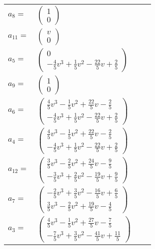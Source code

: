 \documentclass[1p]{elsarticle_modified}
\theoremstyle{definition}
\begin{document}
\begin{tabular}{m{7pt} m{180pt} m{7pt} m{180pt} }
\flushright $a_{8}=$&$\begin{pmatrix}1\\0\end{pmatrix}$ \\
\flushright $a_{11}=$&$\begin{pmatrix}v\\0\end{pmatrix}$ \\
\flushright $a_{5}=$&$\begin{pmatrix}0\\-\frac{4}{5} v^3+\frac{1}{5} v^2-\frac{22}{5} v+\frac{2}{5}\end{pmatrix}$ \\
\flushright $a_{9}=$&$\begin{pmatrix}1\\0\end{pmatrix}$ \\
\flushright $a_{6}=$&$\begin{pmatrix}\frac{4}{5} v^3-\frac{1}{5} v^2+\frac{22}{5} v-\frac{2}{5}\\-\frac{4}{5} v^3+\frac{1}{5} v^2-\frac{22}{5} v+\frac{2}{5}\end{pmatrix}$ \\
\flushright $a_{4}=$&$\begin{pmatrix}\frac{4}{5} v^3-\frac{1}{5} v^2+\frac{22}{5} v-\frac{2}{5}\\-\frac{4}{5} v^3+\frac{1}{5} v^2-\frac{22}{5} v+\frac{2}{5}\end{pmatrix}$ \\
\flushright $a_{12}=$&$\begin{pmatrix}\frac{3}{5} v^3-\frac{2}{5} v^2+\frac{24}{5} v-\frac{9}{5}\\-\frac{3}{5} v^3+\frac{2}{5} v^2-\frac{19}{5} v+\frac{9}{5}\end{pmatrix}$ \\
\flushright $a_{7}=$&$\begin{pmatrix}-\frac{2}{5} v^3+\frac{3}{5} v^2-\frac{16}{5} v+\frac{6}{5}\\\frac{3}{5} v^3-\frac{2}{5} v^2+\frac{19}{5} v-\frac{4}{5}\end{pmatrix}$ \\
\flushright $a_{3}=$&$\begin{pmatrix}\frac{4}{5} v^3-\frac{1}{5} v^2+\frac{27}{5} v-\frac{7}{5}\\-\frac{7}{5} v^3+\frac{3}{5} v^2-\frac{41}{5} v+\frac{11}{5}\end{pmatrix}$ \\

\end{tabular}
\end{document}
